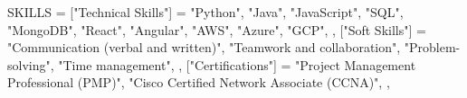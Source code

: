 \begin{luacode}
  SKILLS = {
    ["Technical Skills"] = {
      "Python",
      "Java",
      "JavaScript",
      "SQL",
      "MongoDB",
      "React",
      "Angular",
      "AWS",
      "Azure",
      "GCP",
    },
    ["Soft Skills"] = {
      "Communication (verbal and written)",
      "Teamwork and collaboration",
      "Problem-solving",
      "Time management",
    },
    ["Certifications"] = {
      "Project Management Professional (PMP)",
      "Cisco Certified Network Associate (CCNA)",
    },
  }
\end{luacode}
